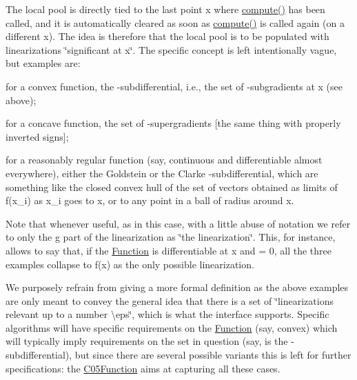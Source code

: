 The local pool is directly tied to the last point x where \mbox{\hyperlink{class_s_m_spp__di__unipi__it_1_1_function_a504d4e3e174c7a518cc66156a8a45ce5}{compute()}} has been called, and it is automatically cleared as soon as \mbox{\hyperlink{class_s_m_spp__di__unipi__it_1_1_function_a504d4e3e174c7a518cc66156a8a45ce5}{compute()}} is called again (on a different x). The idea is therefore that the local pool is to be populated with linearizations \char`\"{}significant at x\char`\"{}. The specific concept is left intentionally vague, but examples are\+:


\begin{DoxyItemize}
\item for a convex function, the -\/subdifferential, i.\+e., the set of -\/subgradients at x (see above);
\item for a concave function, the set of -\/supergradients \mbox{[}the same thing with properly inverted signs\mbox{]};
\item for a reasonably regular function (say, continuous and differentiable almost everywhere), either the Goldstein or the Clarke -\/subdifferential, which are something like the closed convex hull of the set of vectors obtained as limits of  f(x\+\_\+i) as x\+\_\+i goes to x, or to any point in a ball of radius  around x.
\end{DoxyItemize}

Note that whenever useful, as in this case, with a little abuse of notation we refer to only the g part of the linearization as \char`\"{}the
linearization\char`\"{}. This, for instance, allows to say that, if the \mbox{\hyperlink{class_s_m_spp__di__unipi__it_1_1_function}{Function}} is differentiable at x and  = 0, all the three examples collapse to  f(x) as the only possible linearization.

We purposely refrain from giving a more formal definition as the above examples are only meant to convey the general idea that there is a set of \char`\"{}linearizations relevant up to a number \textbackslash{}eps\char`\"{}, which is what the interface supports. Specific algorithms will have specific requirements on the \mbox{\hyperlink{class_s_m_spp__di__unipi__it_1_1_function}{Function}} (say, convex) which will typically imply requirements on the set in question (say, is the -\/subdifferential), but since there are several possible variants this is left for further specifications\+: the \mbox{\hyperlink{class_s_m_spp__di__unipi__it_1_1_c05_function}{C05\+Function}} aims at capturing all these cases.

